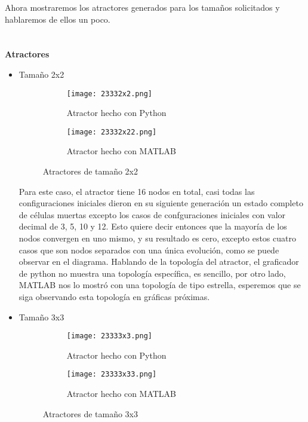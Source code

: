 \documentclass{article}
\begin{document}
 Ahora mostraremos los atractores generados para los tamaños solicitados y hablaremos de ellos un poco.
 \\
 \\
 \\
 \textbf{Atractores}
 	\begin{itemize}
 	\vspace{100pt}
 	\item Tamaño 2x2
 	
 		\begin{figure}[htbp]
 		\centering
 		\begin{subfigure}{0.48\textwidth}
 			\centering
 			\texttt{[image: 23332x2.png]}
 			\caption{Atractor hecho con Python}
 			\label{fig:A1}
 		\end{subfigure}
 		\hfill
 		\begin{subfigure}{0.48\textwidth}
 			\centering
 			\texttt{[image: 23332x22.png]}
 			\caption{Atractor hecho con MATLAB}
 			\label{fig:A2}
 		\end{subfigure}
 		\caption{Atractores de tamaño 2x2}
 		\label{fig:conjuntoA}
 	\end{figure}
 	
 	Para este caso, el atractor tiene 16 nodos en total, casi todas las configuraciones iniciales dieron en su siguiente generación un estado completo de células muertas excepto los casos de confguraciones iniciales con valor decimal de 3, 5, 10 y 12. Esto quiere decir entonces que la mayoría de los nodos convergen en uno mismo, y su resultado es cero, excepto estos cuatro casos que son nodos separados con una única evolución, como se puede observar en el diagrama.
 	Hablando de la topología del atractor, el graficador de python no muestra una topología específica, es sencillo, por otro lado, MATLAB nos lo mostró con una topología de tipo estrella, esperemos que se siga observando esta topología en gráficas próximas. 
 	
 	\item Tamaño 3x3
 	
 		\begin{figure}[htbp]
 			\centering
 			\begin{subfigure}{0.48\textwidth}
 				\centering
 				\texttt{[image: 23333x3.png]}
 				\caption{Atractor hecho con Python}
 				\label{fig:A4}
 			\end{subfigure}
 			\hfill
 			\begin{subfigure}{0.48\textwidth}
 				\centering
 				\texttt{[image: 23333x33.png]}
 				\caption{Atractor hecho con MATLAB}
 				\label{fig:A3}
 			\end{subfigure}
 			\caption{Atractores de tamaño 3x3}
 			\label{fig:conjuntoA2}
 		\end{figure}
 	

\end{itemize}
\end{document}
